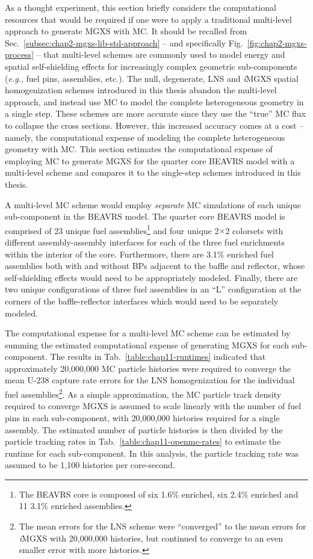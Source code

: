 As a thought experiment, this section briefly considers the computational resources that would be required if one were to apply a traditional multi-level approach to generate \ac{MGXS} with \ac{MC}. It should be recalled from Sec.~\ref{subsec:chap2-mgxs-lib-std-approach} -- and specifically Fig.~\ref{fig:chap2-mgxs-process} -- that multi-level schemes are commonly used to model energy and spatial self-shielding effects for increasingly complex geometric sub-components (\textit{e.g.}, fuel pins, assemblies, etc.). The null, degenerate, \ac{LNS} and \textit{i}\ac{MGXS} spatial homogenization schemes introduced in this thesis abandon the multi-level approach, and instead use \ac{MC} to model the complete heterogeneous geometry in a single step. These schemes are more accurate since they use the ``true'' \ac{MC} flux to collapse the cross sections. However, this increased accuracy comes at a cost -- namely, the computational expense of modeling the complete heterogeneous geometry with \ac{MC}. This section estimates the computational expense of employing \ac{MC} to generate \ac{MGXS} for the quarter core \ac{BEAVRS} model with a multi-level scheme and compares it to the single-step schemes introduced in this thesis.

A multi-level \ac{MC} scheme would employ \textit{separate} \ac{MC} simulations of each unique sub-component in the \ac{BEAVRS} model. The quarter core \ac{BEAVRS} model is comprised of 23 unique fuel assemblies\footnote{The \ac{BEAVRS} core is composed of six 1.6\% enriched, six 2.4\% enriched and 11 3.1\% enriched assemblies.} and four unique 2$\times$2 colorsets with different assembly-assembly interfaces for each of the three fuel enrichments within the interior of the core. Furthermore, there are 3.1\% enriched fuel assemblies both with and without \acp{BP} adjacent to the baffle and reflector, whose self-shielding effects would need to be appropriately modeled. Finally, there are two unique configurations of three fuel assemblies in an ``L'' configuration at the corners of the baffle-reflector interfaces which would need to be separately modeled.

The computational expense for a multi-level \ac{MC} scheme can be estimated by summing the estimated computational expense of generating \ac{MGXS} for each sub-component. The results in Tab.~\ref{table:chap11-runtimes} indicated that approximately 20,000,000 \ac{MC} particle histories were required to converge the mean U-238 capture rate errors for the \ac{LNS} homogenization for the individual fuel assemblies\footnote{The mean errors for the \ac{LNS} scheme were ``converged'' to the mean errors for \textit{i}\ac{MGXS} with 20,000,000 histories, but continued to converge to an even smaller error with more histories.}. As a simple approximation, the \ac{MC} particle track density required to converge \ac{MGXS} is assumed to scale linearly with the number of fuel pins in each sub-component, with 20,000,000 histories required for a single assembly. The estimated number of particle histories is then divided by the particle tracking rates in Tab.~\ref{table:chap11-openmc-rates} to estimate the runtime for each sub-component. In this analysis, the particle tracking rate was assumed to be 1,100 histories per core-second.

